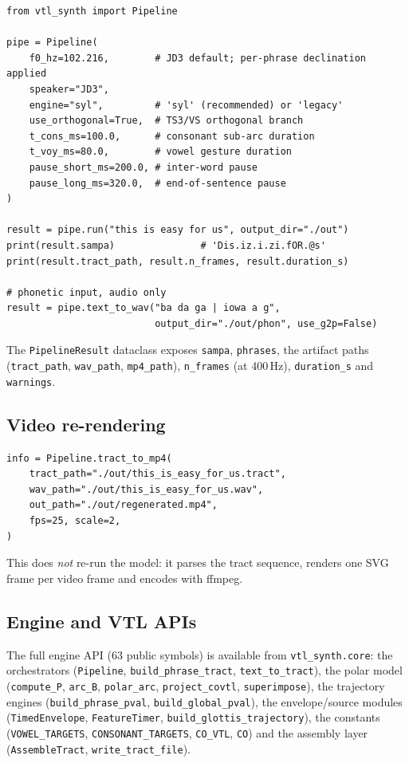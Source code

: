 \documentclass[11pt,a4paper]{article}
\begin{document}
\begin{lstlisting}[style=python]
from vtl_synth import Pipeline

pipe = Pipeline(
    f0_hz=102.216,        # JD3 default; per-phrase declination applied
    speaker="JD3",
    engine="syl",         # 'syl' (recommended) or 'legacy'
    use_orthogonal=True,  # TS3/VS orthogonal branch
    t_cons_ms=100.0,      # consonant sub-arc duration
    t_voy_ms=80.0,        # vowel gesture duration
    pause_short_ms=200.0, # inter-word pause
    pause_long_ms=320.0,  # end-of-sentence pause
)

result = pipe.run("this is easy for us", output_dir="./out")
print(result.sampa)               # 'Dis.iz.i.zi.fOR.@s'
print(result.tract_path, result.n_frames, result.duration_s)

# phonetic input, audio only
result = pipe.text_to_wav("ba da ga | iowa a g",
                          output_dir="./out/phon", use_g2p=False)
\end{lstlisting}

The \texttt{PipelineResult} dataclass exposes \texttt{sampa},
\texttt{phrases}, the artifact paths (\texttt{tract\_path},
\texttt{wav\_path}, \texttt{mp4\_path}), \texttt{n\_frames}
(at 400\,Hz), \texttt{duration\_s} and \texttt{warnings}.

\subsection{Video re-rendering}

\begin{lstlisting}[style=python]
info = Pipeline.tract_to_mp4(
    tract_path="./out/this_is_easy_for_us.tract",
    wav_path="./out/this_is_easy_for_us.wav",
    out_path="./out/regenerated.mp4",
    fps=25, scale=2,
)
\end{lstlisting}

This does \emph{not} re-run the model: it parses the tract sequence,
renders one SVG frame per video frame and encodes with ffmpeg.

\subsection{Engine and VTL APIs}

The full engine API (63 public symbols) is available from
\texttt{vtl\_synth.core}: the orchestrators
(\texttt{Pipeline}, \texttt{build\_phrase\_tract}, \texttt{text\_to\_tract}),
the polar model (\texttt{compute\_P}, \texttt{arc\_B}, \texttt{polar\_arc},
\texttt{project\_covtl}, \texttt{superimpose}), the trajectory engines
(\texttt{build\_phrase\_pval}, \texttt{build\_global\_pval}), the
envelope/source modules (\texttt{TimedEnvelope}, \texttt{FeatureTimer},
\texttt{build\_glottis\_trajectory}), the constants
(\texttt{VOWEL\_TARGETS}, \texttt{CONSONANT\_TARGETS}, \texttt{CO\_VTL},
\texttt{CO}) and the assembly layer (\texttt{AssembleTract},
\texttt{write\_tract\_file}).
\end{document}
